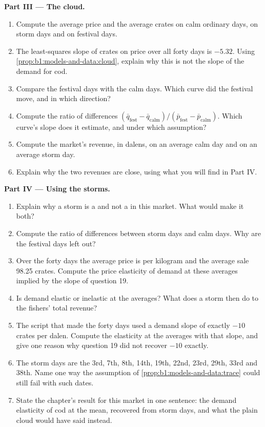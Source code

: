 \begin{problem}
\medskip\noindent\textbf{Part III --- The cloud.}
\begin{enumerate}[resume]
  \item Compute the average price and the average crates on calm ordinary days, on storm days and on festival days.
  \item The least-squares slope of crates on price over all forty days is $-5.32$. %
    Using \cref{prop:b1:models-and-data:cloud}, explain why this is not the slope of the demand for cod.
  \item Compare the festival days with the calm days. Which curve did the festival move, and in which direction?
  \item Compute the ratio of differences $(\bar q_{\text{fest}} - \bar q_{\text{calm}})/(\bar p_{\text{fest}} - \bar p_{\text{calm}})$. Which curve's slope does it estimate, and under which assumption?
  \item Compute the market's revenue, in dalens, on an average calm day and on an average storm day.
  \item Explain why the two revenues are close, using what you will find in Part IV.
\end{enumerate}

\medskip\noindent\textbf{Part IV --- Using the storms.}
\begin{enumerate}[resume]
  \item Explain why a storm is a  and not a  in this market. What would make it both?
  \item Compute the ratio of differences between storm days and calm days. Why are the festival days left out?
  \item Over the forty days the average price is  per kilogram and the average sale 98.25 crates. %
    Compute the price elasticity of demand at these averages implied by the slope of question 19.
  \item Is demand elastic or inelastic at the averages? What does a storm then do to the fishers' total revenue?
  \item The script that made the forty days used a demand slope of exactly $-10$ crates per dalen. Compute the elasticity at the averages with that slope, and give one reason why question 19 did not recover $-10$ exactly.
  \item The storm days are the 3rd, 7th, 8th, 14th, 19th, 22nd, 23rd, 29th, 33rd and 38th. Name one way the assumption of \cref{prop:b1:models-and-data:trace} could still fail with such dates.
  \item State the chapter's result for this market in one sentence: the demand elasticity of cod at the mean, recovered from storm days, and what the plain cloud would have said instead.
\end{enumerate}
\end{problem}
